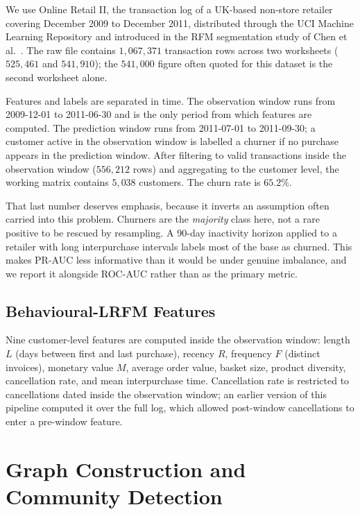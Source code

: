 \documentclass[runningheads]{llncs}
\begin{document}
We use Online Retail II, the transaction log of a UK-based non-store retailer
covering December 2009 to December 2011, distributed through the UCI Machine
Learning Repository \cite{uci2019onlineretail} and introduced in the RFM
segmentation study of Chen et al.\ \cite{chen2012datamining}. The raw file
contains $1{,}067{,}371$ transaction rows
across two worksheets ($525{,}461$ and $541{,}910$); the $541{,}000$ figure often
quoted for this dataset is the second worksheet alone.

Features and labels are separated in time. The observation window runs from
2009-12-01 to 2011-06-30 and is the only period from which features are computed.
The prediction window runs from 2011-07-01 to 2011-09-30; a customer active in
the observation window is labelled a churner if no purchase appears in the
prediction window. After filtering to valid transactions inside the observation
window ($556{,}212$ rows) and aggregating to the customer level, the working
matrix contains $5{,}038$ customers. The churn rate is $65.2\%$.

That last number deserves emphasis, because it inverts an assumption often
carried into this problem. Churners are the \emph{majority} class here, not a
rare positive to be rescued by resampling. A 90-day inactivity horizon applied to
a retailer with long interpurchase intervals labels most of the base as churned.
This makes PR-AUC less informative than it would be under genuine imbalance, and
we report it alongside ROC-AUC rather than as the primary metric.

\subsection{Behavioural-LRFM Features}

Nine customer-level features are computed inside the observation window: length
$L$ (days between first and last purchase), recency $R$, frequency $F$ (distinct
invoices), monetary value $M$, average order value, basket size, product
diversity, cancellation rate, and mean interpurchase time. Cancellation rate is
restricted to cancellations dated inside the observation window; an earlier
version of this pipeline computed it over the full log, which allowed
post-window cancellations to enter a pre-window feature.

\section{Graph Construction and Community Detection}
\end{document}
